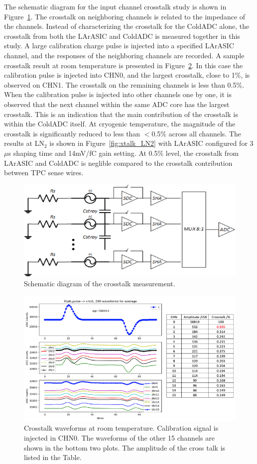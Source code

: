 \label{sec:4.5}
The schematic diagram for the input channel crosstalk study is shown in Figure~\ref{fig:xtalk_schematic}. 
The crosstalk on neighboring channels is related to the impedance of the channels. 
Instead of characterizing the crosstalk for the ColdADC alone, the 
crosstalk from both the LArASIC and ColdADC is measured together in this study. 
A large calibration charge pulse is injected into a specified LArASIC channel, and the responses of 
the neighboring channels are recorded. A sample crosstalk result at room temperature 
is presented in Figure~\ref{fig:xtalk_RT}. In this case the calibration pulse is injected into 
CHN0, and the largest crosstalk, close to 1\%, is observed on CHN1. The crosstalk on the remaining channels 
is less than 0.5\%.  When the calibration pulse is injected into other channels one by one, it is 
observed that the next channel within the same ADC core has the largest crosstalk. 
This is an indication that the main contribution of the crosstalk is within the ColdADC itself. 
At cryogenic temperature, the magnitude of the crosstalk is significantly reduced to less than $<$0.5\% across 
all channels. The results at LN$_2$ is shown in Figure~\ref{fig:xtalk_LN2} with LArASIC configured
for 3$\mu$s shaping time and 14mV/fC gain setting. At 0.5\% level, the crosstalk from LArASIC and 
ColdADC is neglible compared to the crosstalk contribution between TPC sense wires.
\begin{figure}[h!]
\centering
  \includegraphics[width=0.7\linewidth]{figures/xtalk_schematic.png}
  \caption{Schematic diagram of the crosstalk measurement.}
  \label{fig:xtalk_schematic}
\end{figure}
\begin{figure}[h!]
\centering
  \includegraphics[width=0.7\linewidth]{figures/xtalk_RT.png}
  \caption{Crosstalk waveforms at room temperature. Calibration signal is injected in CHN0. The waveforms of the other 15 channels are shown in the bottom two plots. The amplitude of the cross talk is listed in the Table.}
  \label{fig:xtalk_RT}
\end{figure}
